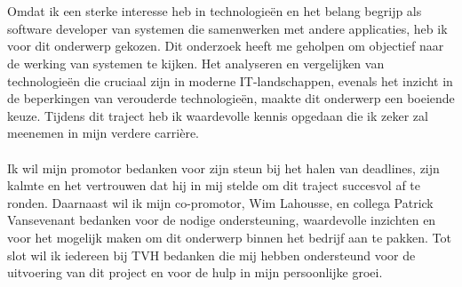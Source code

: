 
\chapter*{}%
\label{ch:voorwoord}


Omdat ik een sterke interesse heb in technologieën en het belang begrijp als software developer van systemen die samenwerken met andere applicaties, heb ik voor dit onderwerp gekozen. 
Dit onderzoek heeft me geholpen om objectief naar de werking van systemen te kijken. 
Het analyseren en vergelijken van technologieën die cruciaal zijn in moderne IT-landschappen, evenals het inzicht in de beperkingen van verouderde technologieën, maakte dit onderwerp een boeiende keuze. 
Tijdens dit traject heb ik waardevolle kennis opgedaan die ik zeker zal meenemen in mijn verdere carrière.
\\\\
Ik wil mijn promotor bedanken voor zijn steun bij het halen van deadlines, zijn kalmte en het vertrouwen dat hij in mij stelde om dit traject succesvol af te ronden.
Daarnaast wil ik mijn co-promotor, Wim Lahousse, en collega Patrick Vansevenant bedanken voor de nodige ondersteuning, waardevolle inzichten en voor het mogelijk maken om dit onderwerp binnen het bedrijf aan te pakken. 
Tot slot wil ik iedereen bij TVH bedanken die mij hebben ondersteund voor de uitvoering van dit project en voor de hulp in mijn persoonlijke groei.
